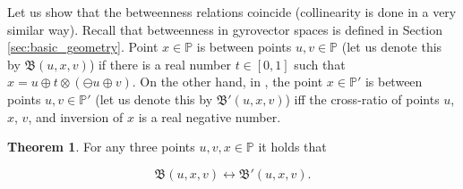 \documentclass[a4paper]{article}
\theoremstyle{definition}
\newtheorem{theorem}{Theorem}[section]
\begin{document}
Let us show that the betweenness relations coincide (collinearity is
done in a very similar way). Recall that betweenness in gyrovector
spaces is defined in Section \ref{sec:basic_geometry}. Point
$x \in \mathbb{P}$ is between points $u, v \in \mathbb{P}$ (let us
denote this by $\mathfrak{B}(u, x, v)$) if there is a real number
$t \in [0, 1]$ such that
$x = u \oplus t \otimes (\ominus u \oplus v)$. On the other hand, in
\cite{amai-poincare}, the point $x \in \mathbb{P}'$ is between points
$u, v \in \mathbb{P}'$ (let us denote this by
$\mathfrak{B}'(u, x, v)$) iff the cross-ratio of points $u$, $x$, $v$,
and inversion of $x$ is a real negative number.

\begin{theorem}
  For any three points $u, v, x \in \mathbb{P}$ it holds that

  $$\mathfrak{B}(u, x, v) \longleftrightarrow \mathfrak{B}'(u, x, v).$$  
\end{theorem}
\end{document}
